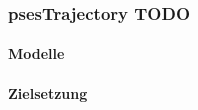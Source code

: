 \subsubsection{psesTrajectory TODO} %
\label{subsubsec:02psesTrajectory}
\paragraph{Modelle}

\paragraph{Zielsetzung}
